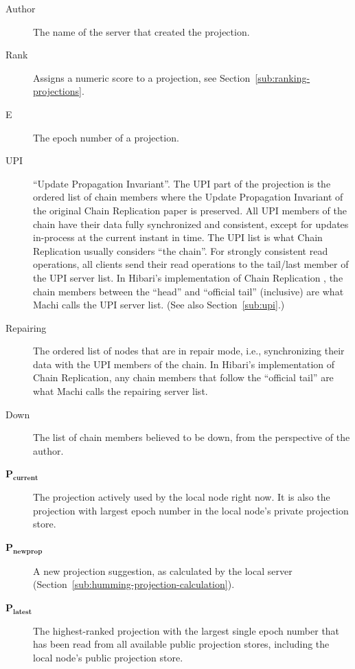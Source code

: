 \documentclass[preprint,10pt]{sigplanconf}
\begin{document}
\begin{description}
\item[Author] The name of the server that created the projection.

\item[Rank] Assigns a numeric score to a projection, see
  Section~\ref{sub:ranking-projections}.

\item[E] The epoch number of a projection.

\item[UPI] ``Update Propagation Invariant''.  The UPI part of the projection
  is the ordered list of chain members where the
  Update Propagation Invariant of the original Chain Replication paper
  \cite{chain-replication} is preserved.  
  All UPI  members of the chain have their data fully synchronized and
  consistent, except for updates in-process at the current instant in time.
  The UPI list is what Chain Replication usually considers ``the
  chain''.  For strongly consistent read operations, all clients
  send their read operations to the tail/last member of the UPI server
  list.
  In Hibari's implementation of Chain Replication
  \cite{cr-theory-and-practice}, the chain members between the
  ``head'' and ``official tail'' (inclusive) are what Machi calls the
  UPI server list.  (See also Section~\ref{sub:upi}.)

\item[Repairing] The ordered list of nodes that are in repair mode,
  i.e., synchronizing their data with the UPI members of the chain.
  In Hibari's implementation of Chain Replication, any chain members
  that follow the ``official tail'' are what Machi calls the repairing
  server list.

\item[Down] The list of chain members believed to be down, from the
  perspective of the author.

\item[$\mathbf{P_{current}}$] The projection actively used by the local
  node right now.  It is also the projection with largest
  epoch number in the local node's private projection store.

\item[$\mathbf{P_{newprop}}$] A new projection suggestion, as
  calculated by the local server
  (Section~\ref{sub:humming-projection-calculation}).

\item[$\mathbf{P_{latest}}$] The highest-ranked projection with the largest
  single epoch number that has been read from all available public
  projection stores, including the local node's public projection store.


\end{description}
\end{document}

